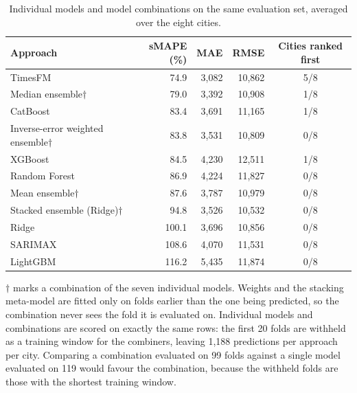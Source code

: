 \begin{table}[htbp]
\centering
\small
\caption{Individual models and model combinations on the same evaluation set, averaged
over the eight cities.}
\label{tab:ensembles}
\begin{tabular}{lrrrc}
\toprule
Approach & sMAPE (\%) & MAE & RMSE & Cities ranked first \\
\midrule
TimesFM & 74.9 & 3,082 & 10,862 & 5/8 \\
Median ensemble$\dagger$ & 79.0 & 3,392 & 10,908 & 1/8 \\
CatBoost & 83.4 & 3,691 & 11,165 & 1/8 \\
Inverse-error weighted ensemble$\dagger$ & 83.8 & 3,531 & 10,809 & 0/8 \\
XGBoost & 84.5 & 4,230 & 12,511 & 1/8 \\
Random Forest & 86.9 & 4,224 & 11,827 & 0/8 \\
Mean ensemble$\dagger$ & 87.6 & 3,787 & 10,979 & 0/8 \\
Stacked ensemble (Ridge)$\dagger$ & 94.8 & 3,526 & 10,532 & 0/8 \\
Ridge & 100.1 & 3,696 & 10,856 & 0/8 \\
SARIMAX & 108.6 & 4,070 & 11,531 & 0/8 \\
LightGBM & 116.2 & 5,435 & 11,874 & 0/8 \\
\bottomrule
\end{tabular}

\vspace{0.5em}
\begin{minipage}{\textwidth}
\footnotesize
$\dagger$ marks a combination of the seven individual models. Weights and the stacking
meta-model are fitted only on folds earlier than the one being predicted, so the
combination never sees the fold it is evaluated on. Individual models and combinations are
scored on exactly the same rows: the first 20 folds are withheld as a training window for
the combiners, leaving 1{,}188 predictions per approach per city. Comparing a combination
evaluated on 99 folds against a single model evaluated on 119 would favour the combination,
because the withheld folds are those with the shortest training window.
\end{minipage}
\end{table}
